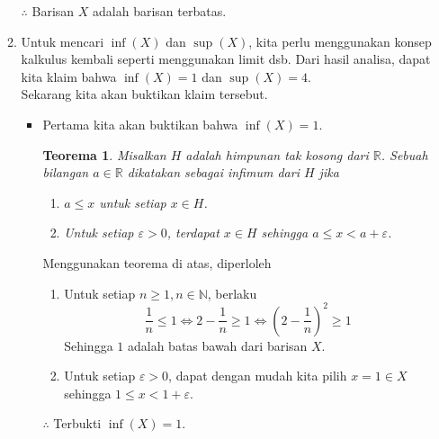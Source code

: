 \documentclass[10pt,openany,a4paper]{article}
\newcommand{\R}{\mathbb{R}}
\newcommand{\N}{\mathbb{N}}
\newtheorem*{teorema}{Teorema}
\begin{document}
\begin{enumerate}
\begin{enumerate}
        $\therefore$ Barisan $X$ adalah barisan terbatas.

        \item Untuk mencari $\inf(X)$ dan $\sup(X)$, kita perlu menggunakan konsep kalkulus kembali seperti menggunakan limit dsb. Dari hasil analisa, dapat kita klaim bahwa $\inf(X)=1$ dan $\sup(X)=4$.\\
        
        Sekarang kita akan buktikan klaim tersebut.
        \begin{itemize}
            \item Pertama kita akan buktikan bahwa $\inf(X)=1$.
            \begin{teorema}
                Misalkan $H$ adalah himpunan tak kosong dari $\R$. Sebuah bilangan $a\in\R$ dikatakan sebagai infimum dari $H$ jika
                \begin{enumerate}
                    \item $a\leq x$ untuk setiap $x\in H$.
                    \item Untuk setiap $\varepsilon>0$, terdapat $x\in H$ sehingga $a\leq x<a+\varepsilon$.\\
                \end{enumerate}
            \end{teorema}

            Menggunakan teorema di atas, diperloleh
            \begin{enumerate}
                \item Untuk setiap $n\geq 1,n\in\N$, berlaku
                \[\frac{1}{n}\leq 1\iff 2-\frac{1}{n}\geq 1\iff \left(2-\frac{1}{n}\right)^2\geq 1\]
                Sehingga $1$ adalah batas bawah dari barisan $X$.
                \item Untuk setiap $\varepsilon>0$, dapat dengan mudah kita pilih $x=1\in X$ sehingga $1\leq x<1+\varepsilon$.\\
            \end{enumerate}

            $\therefore$ Terbukti $\inf(X)=1$.\\


\end{itemize}
\end{enumerate}
\end{enumerate}
\end{document}

